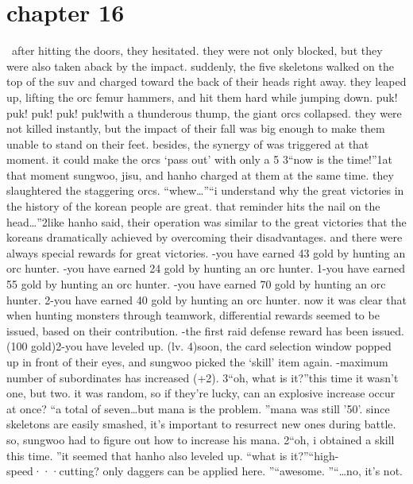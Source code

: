 \section{chapter 16}






 after hitting the doors, they hesitated.
 they were not only blocked, but they were also taken aback by the impact.
 suddenly, the five skeletons walked on the top of the suv and charged toward the back of their heads right away.
 they leaped up, lifting the orc femur hammers, and hit them hard while jumping down.
puk! puk! puk! puk! puk!with a thunderous thump, the giant orcs collapsed.
 they were not killed instantly, but the impact of their fall was big enough to make them unable to stand on their feet.
besides, the synergy of  was triggered at that moment.
 it could make the orcs ‘pass out’ with only a 5%
3“now is the time!”1at that moment sungwoo, jisu, and hanho charged at them at the same time.
 they slaughtered the staggering orcs.
“whew…”“i understand why the great victories in the history of the korean people are great.
 that reminder hits the nail on the head…”2like hanho said, their operation was similar to the great victories that the koreans dramatically achieved by overcoming their disadvantages.
 and there were always special rewards for great victories.
-you have earned 43 gold by hunting an orc hunter.
-you have earned 24 gold by hunting an orc hunter.
1-you have earned 55 gold by hunting an orc hunter.
-you have earned 70 gold by hunting an orc hunter.
2-you have earned 40 gold by hunting an orc hunter.
now it was clear that when hunting monsters through teamwork, differential rewards seemed to be issued, based on their contribution.
-the first raid defense reward has been issued.
 (100 gold)2-you have leveled up.
 (lv.
 4)soon, the card selection window popped up in front of their eyes, and sungwoo picked the ‘skill’ item again.
-maximum number of subordinates has increased (+2).
3“oh, what is it?”this time it wasn’t one, but two.
 it was random, so if they’re lucky, can an explosive increase occur at once?
“a total of seven…but mana is the problem.
”mana was still ’50’.
 since skeletons are easily smashed, it’s important to resurrect new ones during battle.
 so, sungwoo had to figure out how to increase his mana.
2“oh, i obtained a skill this time.
”it seemed that hanho also leveled up.
“what is it?”“high-speed···cutting? only daggers can be applied here.
”“awesome.
”“…no, it’s not.
